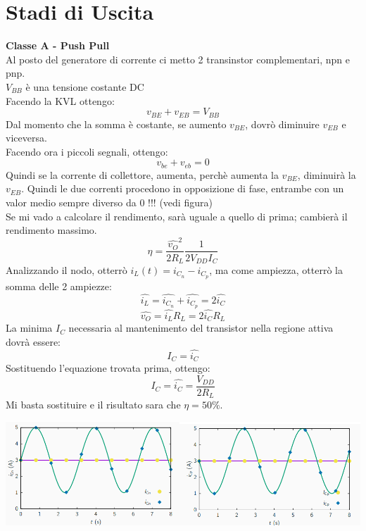 \documentclass{article}
\begin{document}
\section{Stadi di Uscita}
\textbf{Classe A - Push Pull}\\
Al posto del generatore di corrente ci metto 2 transinstor complementari, npn e pnp.\\
$V_{BB}$ è una tensione costante DC \\
Facendo la KVL ottengo:\\
\begin{equation}
    v_{BE}+v_{EB}=V_{BB}
\end{equation}
Dal momento che la somma è costante, se aumento $v_{BE}$, dovrò diminuire $v_{EB}$ e viceversa.\\
Facendo ora i piccoli segnali, ottengo: \\
\begin{equation}
    v_{be}+v_{eb}=0
\end{equation}
Quindi se la corrente di collettore, aumenta, perchè aumenta la $v_{BE}$, diminuirà la $v_{EB}$. Quindi le due correnti procedono in opposizione di fase, entrambe con un valor medio sempre diverso da 0 !!! (vedi figura)\\
Se mi vado a calcolare il rendimento, sarà uguale a quello di prima; cambierà il rendimento massimo.\\
\begin{equation}
    \eta=\frac{\hat{v_{O}}^2}{2R_{L}}\frac{1}{2V_{DD}I_{C}}
\end{equation}
Analizzando il nodo, otterrò $i_{L}(t)=i_{C_{n}}-i_{C_{p}}$, ma come ampiezza, otterrò la somma delle 2 ampiezze: 
\begin{equation}
    \hat{i_{L}}=\hat{i_{C_{n}}}+\hat{i_{C_{p}}}=2\hat{i_{C}}
\end{equation}
\begin{equation}
    \hat{v_{O}}=\hat{i_{L}}R_{L}=2\hat{i_{C}}R_{L}
\end{equation}
La minima $I_{C}$ necessaria al mantenimento del transistor nella regione attiva dovrà essere:
\begin{equation}
    I_{C}=\hat{i_{C}}
\end{equation}
Sostituendo l'equazione trovata prima, ottengo:
\begin{equation}
    I_{C}=\hat{i_{C}}=\frac{V_{DD}}{2R_{L}}
\end{equation}
Mi basta sostituire e il risultato sara che $ \eta=50\% $.
\begin{center}
    \includegraphics[scale=0.6]{Exit.png}
\end{center}
\end{document}
